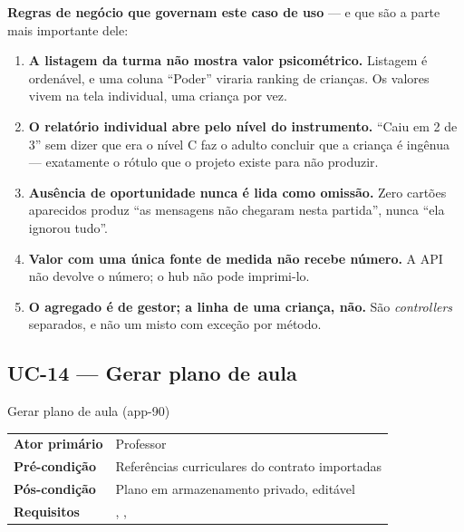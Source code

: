 \textbf{Regras de negócio que governam este caso de uso} --- e que são a parte
mais importante dele:

\begin{enumerate}
  \item \textbf{A listagem da turma não mostra valor psicométrico.} Listagem é
    ordenável, e uma coluna \enquote{Poder} viraria ranking de crianças. Os
    valores vivem na tela individual, uma criança por vez.
  \item \textbf{O relatório individual abre pelo nível do instrumento.}
    \enquote{Caiu em 2 de 3} sem dizer que era o nível C faz o adulto concluir
    que a criança é ingênua --- exatamente o rótulo que o projeto existe para
    não produzir.
  \item \textbf{Ausência de oportunidade nunca é lida como omissão.} Zero
    cartões aparecidos produz \enquote{as mensagens não chegaram nesta partida},
    nunca \enquote{ela ignorou tudo}.
  \item \textbf{Valor com uma única fonte de medida não recebe número.} A API
    não devolve o número; o hub não pode imprimi-lo.
  \item \textbf{O agregado é de gestor; a linha de uma criança, não.} São
    \emph{controllers} separados, e não um  misto com exceção por
    método.
\end{enumerate}

\subsection{UC-14 --- Gerar plano de aula}

\begin{especificacao}{ Gerar plano de aula (app-90)}
\begin{tabularx}{\linewidth}{@{}L{28mm}X@{}}
\textbf{Ator primário} & Professor\\
\textbf{Pré-condição} & Referências curriculares do contrato importadas\\
\textbf{Pós-condição} & Plano  em armazenamento privado, editável\\
\textbf{Requisitos} & , , \\
\end{tabularx}
\end{especificacao}

